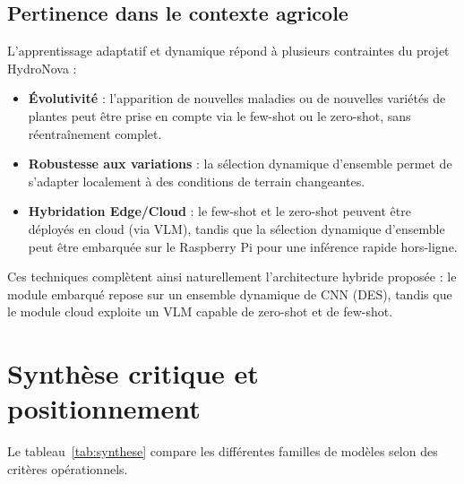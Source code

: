 \subsection{Pertinence dans le contexte agricole}
L’apprentissage adaptatif et dynamique répond à plusieurs contraintes du projet HydroNova :
\begin{itemize}
	\item \textbf{Évolutivité} : l’apparition de nouvelles maladies ou de nouvelles variétés de plantes peut être prise en compte via le few-shot ou le zero-shot, sans réentraînement complet.
	\item \textbf{Robustesse aux variations} : la sélection dynamique d’ensemble permet de s’adapter localement à des conditions de terrain changeantes.
	\item \textbf{Hybridation Edge/Cloud} : le few-shot et le zero-shot peuvent être déployés en cloud (via VLM), tandis que la sélection dynamique d’ensemble peut être embarquée sur le Raspberry Pi pour une inférence rapide hors-ligne.
\end{itemize}
Ces techniques complètent ainsi naturellement l’architecture hybride proposée : le module embarqué repose sur un ensemble dynamique de CNN (DES), tandis que le module cloud exploite un VLM capable de zero-shot et de few-shot.

\section{Synthèse critique et positionnement}
\label{sec:synthese}

Le tableau~\ref{tab:synthese} compare les différentes familles de modèles selon des critères opérationnels.

